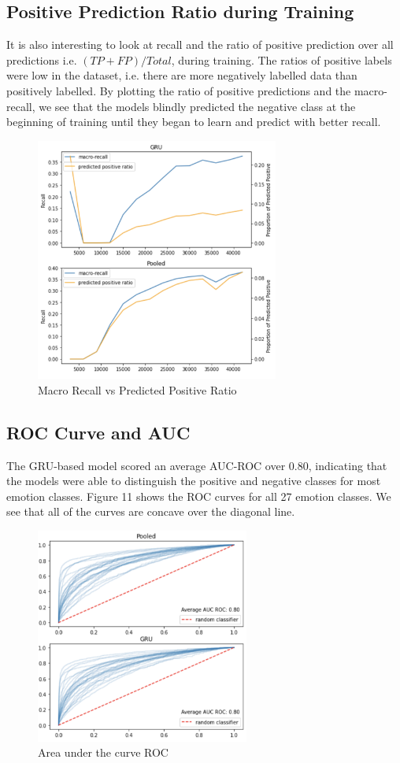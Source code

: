 \documentclass[conference]{IEEEtran}
\begin{document}
\subsection{Positive Prediction Ratio during Training}
It is also interesting to look at recall and the ratio of positive prediction over all predictions i.e. $(TP + FP) /Total$, during training. The ratios of positive labels were low in the dataset, i.e. there are more negatively labelled data than positively labelled. By plotting the ratio of positive predictions and the macro-recall, we see that the models blindly predicted the negative class at the beginning of training until they began to learn and predict with better recall. 


\begin{figure}[htbp]
\centerline{\includegraphics[width=8cm, keepaspectratio,]{fig/recall vs predicted positive ratio.png}}
\caption{Macro Recall vs Predicted Positive Ratio}
\label{fig}
\end{figure}

\subsection{ROC Curve and AUC}
The GRU-based model scored an average AUC-ROC over 0.80, indicating that the models were able to distinguish the positive and negative classes for most emotion classes. Figure 11 shows the ROC curves for all 27 emotion classes. We see that all of the curves are concave over the diagonal line. 

\begin{figure}[htbp]
\centerline{\includegraphics[width=7cm, keepaspectratio,]{fig/roc-curve.png}}
\caption{ Area under the curve ROC }
\label{fig}
\end{figure}
\end{document}

